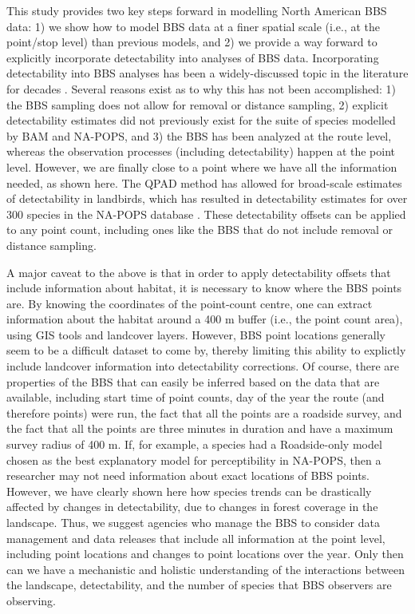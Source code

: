\par This study provides two key steps forward in modelling North American BBS data: 1) we show how to model BBS data at a finer spatial scale (i.e., at the point/stop level) than previous models, and 2) we provide a way forward to explicitly incorporate detectability into analyses of BBS data.
Incorporating detectability into BBS analyses has been a widely-discussed topic in the literature for decades \citep{sauer_observer_1994, ankorikarlinsky_north_2022, zhang_habitat_2021, somershoe_combining_2006, griffith_traffic_2010, binley_better_2023, knight_combination_2021}.
Several reasons exist as to why this has not been accomplished: 1) the BBS sampling does not allow for removal or distance sampling, 2) explicit detectability estimates did not previously exist for the suite of species modelled by BAM and NA-POPS, and 3) the BBS has been analyzed at the route level, whereas the observation processes (including detectability) happen at the point level.
However, we are finally close to a point where we have all the information needed, as shown here.
The QPAD method \citep{solymos_calibrating_2013} has allowed for broad-scale estimates of detectability in landbirds, which has resulted in detectability estimates for over 300 species in the NA-POPS database \citep{edwards_point_2023}.
These detectability offsets can be applied to any point count, including ones like the BBS that do not include removal or distance sampling.

\par A major caveat to the above is that in order to apply detectability offsets that include information about habitat, it is necessary to know where the BBS points are.
By knowing the coordinates of the point-count centre, one can extract information about the habitat around a 400 m buffer (i.e., the point count area), using GIS tools and landcover layers. 
However, BBS point locations generally seem to be a difficult dataset to come by, thereby limiting this ability to explictly include landcover information into detectability corrections.
Of course, there are properties of the BBS that can easily be inferred based on the data that are available, including start time of point counts, day of the year the route (and therefore points) were run, the fact that all the points are a roadside survey, and the fact that all the points are three minutes in duration and have a maximum survey radius of 400 m.
If, for example, a species had a Roadside-only model chosen as the best explanatory model for perceptibility in NA-POPS, then a researcher may not need information about exact locations of BBS points.
However, we have clearly shown here how species trends can be drastically affected by changes in detectability, due to changes in forest coverage in the landscape.
Thus, we suggest agencies who manage the BBS to consider data management and data releases that include all information at the point level, including point locations and changes to point locations over the year.
Only then can we have a mechanistic and holistic understanding of the interactions between the landscape, detectability, and the number of species that BBS observers are observing.
